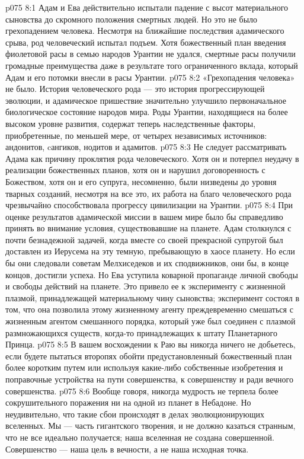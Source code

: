 \vs p075 8:1 Адам и Ева действительно испытали падение с высот материального сыновства до скромного положения смертных людей. Но это не было грехопадением человека. Несмотря на ближайшие последствия адамического срыва, род человеческий испытал подъем. Хотя божественный план введения фиолетовой расы в семью народов Урантии не удался, смертные расы получили громадные преимущества даже в результате того ограниченного вклада, который Адам и его потомки внесли в расы Урантии.
\vs p075 8:2 «Грехопадения человека» не было. История человеческого рода --- это история прогрессирующей эволюции, и адамическое пришествие значительно улучшило первоначальное биологическое состояние народов мира. Роды Урантии, находящиеся на более высоком уровне развития, содержат теперь наследственные факторы, приобретенные, по меньшей мере, от четырех независимых источников: андонитов, cангиков, нодитов и адамитов.
\vs p075 8:3 Не следует рассматривать Адама как причину проклятия рода человеческого. Хотя он и потерпел неудачу в реализации божественных планов, хотя он и нарушил договоренность с Божеством, хотя он и его супруга, несомненно, были низведены до уровня тварных созданий, несмотря на все это, их работа на благо человеческого рода чрезвычайно способствовала прогрессу цивилизации на Урантии.
\vs p075 8:4 \pc При оценке результатов адамической миссии в вашем мире было бы справедливо принять во внимание условия, существовавшие на планете. Адам столкнулся с почти безнадежной задачей, когда вместе со своей прекрасной супругой был доставлен из Иерусема на эту темную, пребывающую в хаосе планету. Но если бы они следовали советам Мелхиседеков и их сподвижников,  они бы, в конце концов, достигли успеха. Но Ева уступила коварной пропаганде личной свободы и свободы действий на планете. Это привело ее к эксперименту с жизненной плазмой, принадлежащей материальному чину сыновства; эксперимент состоял в том, что она позволила этому жизненному агенту преждевременно смешаться с жизненным агентом смешанного порядка, который уже был соединен с плазмой размножающихся существ, когда\hyp{}то принадлежащих к штату Планетарного Принца.
\vs p075 8:5 В вашем восхождении к Раю вы никогда ничего не добьетесь, если будете пытаться второпях обойти предустановленный божественный план более коротким путем или используя какие\hyp{}либо собственные изобретения и поправочные устройства на пути совершенства, к совершенству и ради вечного совершенства.
\vs p075 8:6 \pc Вообще говоря, никогда мудрость не терпела более сокрушительного поражения ни на одной из планет в Небадоне. Но неудивительно, что такие сбои происходят в делах эволюционирующих вселенных. Мы --- часть гигантского творения, и не должно казаться странным, что не все идеально получается; наша вселенная не создана совершенной. Совершенство --- наша цель в вечности, а не наша исходная точка.
